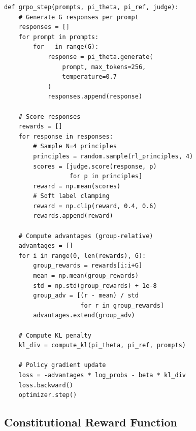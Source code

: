 \documentclass[conference]{IEEEtran}
\begin{document}
\begin{lstlisting}[caption={GRPO Training Loop}]
def grpo_step(prompts, pi_theta, pi_ref, judge):
    # Generate G responses per prompt
    responses = []
    for prompt in prompts:
        for _ in range(G):
            response = pi_theta.generate(
                prompt, max_tokens=256, 
                temperature=0.7
            )
            responses.append(response)
    
    # Score responses
    rewards = []
    for response in responses:
        # Sample N=4 principles
        principles = random.sample(rl_principles, 4)
        scores = [judge.score(response, p) 
                  for p in principles]
        reward = np.mean(scores)
        # Soft label clamping
        reward = np.clip(reward, 0.4, 0.6)
        rewards.append(reward)
    
    # Compute advantages (group-relative)
    advantages = []
    for i in range(0, len(rewards), G):
        group_rewards = rewards[i:i+G]
        mean = np.mean(group_rewards)
        std = np.std(group_rewards) + 1e-8
        group_adv = [(r - mean) / std 
                     for r in group_rewards]
        advantages.extend(group_adv)
    
    # Compute KL penalty
    kl_div = compute_kl(pi_theta, pi_ref, prompts)
    
    # Policy gradient update
    loss = -advantages * log_probs - beta * kl_div
    loss.backward()
    optimizer.step()
\end{lstlisting}


\subsection{Constitutional Reward Function}
\end{document}

